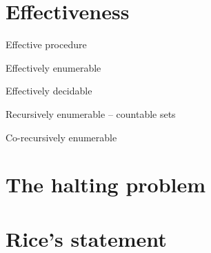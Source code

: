 \section{Effectiveness}

Effective procedure

Effectively enumerable

Effectively decidable

Recursively enumerable -- countable sets

Co-recursively enumerable



\section{The halting problem}

\section{Rice's statement}
